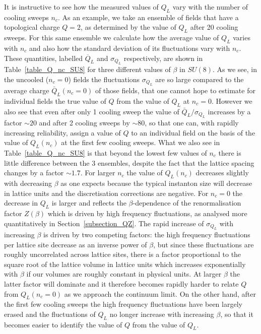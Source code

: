 \documentclass[12pt]{article}
\begin{document}
It is instructive to see  how the measured values of $Q_L$ vary with the number of cooling
sweeps $n_c$. As an example, we take an ensemble of fields that have a topological charge
$Q=2$, as determined by the value of $Q_L$ after 20 cooling sweeps. For this same ensemble
we calculate how the average value of $Q_L$ varies with $n_c$ and also how the standard
deviation of its fluctuations vary with $n_c$. These quantities, labelled $\overline{Q}_L$
and $\sigma_{Q_L}$ respectively, are shown in Table~\ref{table_Q_nc_SU8} for three different
values of $\beta$ in $SU(8)$. As we see, in the uncooled ($n_c=0$) fields the
fluctuations $\sigma_{Q_{L}}$ are so large compared to the average charge $\bar{Q}_L(n_c=0)$
of those fields, that one cannot hope to estimate for individual fields the true value of $Q$ from
the value of $Q_L$ at $n_c=0$. However we also see that even after only 1 cooling sweep the value of
$\bar{Q}_L/\sigma_{Q_{L}}$ increases by a factor $\sim 20$ and after 2 cooling sweeps by $\sim 80$,
so that one can, with rapidly increasing reliability, assign a value of $Q$ to an individual
field on the basis of the value of $Q_L(n_c)$ at the first few cooling sweeps. What we also see
in Table~\ref{table_Q_nc_SU8} is that beyond the lowest few values of $n_c$ there is little
difference between the 3 ensembles, despite the fact that the lattice spacing changes
by a factor $\sim 1.7$. For larger $n_c$ the value of $Q_L(n_c)$ decreases slightly with
decreasing $\beta$ as one expects because the typical instanton size will decrease in lattice
units and the discretisation corrections are negative. For $n_c=0$ the decrease in $Q_L$
is larger and reflects the $\beta$-dependence of the renormalisation factor $Z(\beta)$ which
is driven by high frequency fluctuations, as analysed more quantitatively in
Section~\ref{subsection_QZ}. The rapid increase of $\sigma_{Q_L}$ with increasing $\beta$
is driven by two competing factors: the high frequency fluctuations per lattice site
decrease as an inverse power of $\beta$, but since these fluctuations are roughly
uncorrelated across lattice sites, there is a factor proportional to the square root
of the lattice volume in lattice units which increases exponentially with $\beta$ if our
volumes are roughly constant in physical units. At larger $\beta$ the latter factor
will dominate and it therefore becomes rapidly harder to relate $Q$ from $Q_L(n_c=0)$
as we approach the continuum limit. On the other hand, after the first few cooling sweeps
the high frequency fluctuations have been largely erased and the fluctuations of $Q_L$ no
longer increase with increasing $\beta$, so that it becomes easier to identify the
value of $Q$ from the value of $Q_L$.
\end{document}
